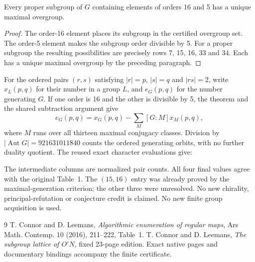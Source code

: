 \documentclass[11pt,a4paper]{article}
\begin{document}
\begin{theorem}
Every proper subgroup of $G$ containing elements of orders 16 and 5
has a unique maximal overgroup.
\end{theorem}
\begin{proof}
The order-16 element places its subgroup in the certified overgroup
set. The order-5 element makes the subgroup order divisible by 5.
For a proper subgroup the resulting possibilities are precisely
rows 7, 15, 16, 33 and 34. Each has a unique maximal overgroup by the
preceding paragraph.
\end{proof}

For the ordered pairs $(r,s)$ satisfying $|r|=p$, $|s|=q$ and
$|rs|=2$, write $x_L(p,q)$ for their number in a group $L$, and
$e_G(p,q)$ for the number generating $G$. If one order is 16 and the
other is divisible by 5, the theorem and the shared subtraction
argument give
\[
 e_G(p,q)=x_G(p,q)-\sum_{M}[G:M]x_M(p,q),
\]
where $M$ runs over all thirteen maximal conjugacy classes. Division
by $|\operatorname{Aut}G|=921631011840$ counts the ordered generating
orbits, with no further duality quotient. The reused exact character
evaluations give:

The intermediate columns are normalized pair counts. All four final
values agree with the original Table~1. The $(15,16)$ entry was already
proved by the maximal-generation criterion; the other three were
unresolved. No new chirality, principal-refutation or conjecture
credit is claimed. No new finite group acquisition is used.


\begin{thebibliography}{9}
 T. Connor and D. Leemans, \emph{Algorithmic enumeration
of regular maps}, Ars Math. Contemp. 10 (2016), 211--222, Table~1.
 T. Connor and D. Leemans, \emph{The subgroup lattice
of $O'N$}, fixed 23-page edition. Exact native pages and documentary
bindings accompany the finite certificate.
\end{thebibliography}
\end{document}
